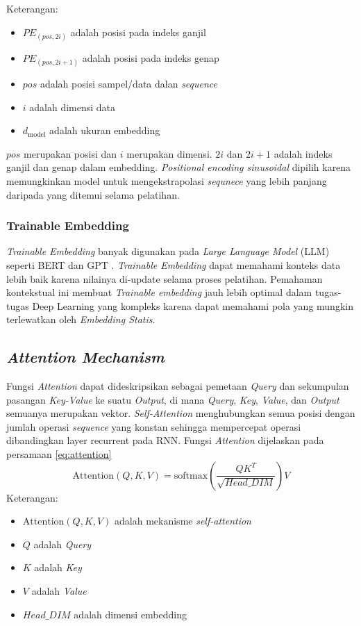 Keterangan:
\begin{itemize}
    \item $PE_{(pos, 2i)}$ adalah posisi pada indeks ganjil
    \item $PE_{(pos, 2i+1)}$ adalah posisi pada indeks genap
    \item $pos$ adalah posisi sampel/data dalan \textit{sequence}
    \item $i$ adalah dimensi data
    \item $d_{\text{model}}$ adalah ukuran embedding
\end{itemize}
$pos$ merupakan posisi dan $i$ merupakan dimensi. $2i$ dan $2i+1$ adalah indeks ganjil dan genap dalam embedding. \textit{Positional encoding sinusoidal} dipilih karena memungkinkan model untuk mengekstrapolasi \textit{sequnece} yang lebih panjang daripada yang ditemui selama pelatihan.

\subsubsection{Trainable Embedding}
\label{subsubsec:trainable_embedding}
\textit{Trainable Embedding} banyak digunakan pada \textit{Large Language Model} (LLM) seperti BERT \cite{devlin2019bertpretrainingdeepbidirectional} dan GPT \cite{radford2019language}. \textit{Trainable Embedding} dapat memahami konteks data lebih baik karena nilainya di-update selama proses pelatihan. Pemahaman kontekstual ini membuat \textit{Trainable embedding} jauh lebih optimal dalam tugas-tugas Deep Learning yang kompleks karena dapat memahami pola yang mungkin terlewatkan oleh \textit{Embedding Statis}.

\subsection{\textit{Attention Mechanism}}
Fungsi \textit{Attention} dapat dideskripsikan sebagai pemetaan \textit{Query} dan sekumpulan pasangan \textit{Key-Value} ke suatu \textit{Output}, di mana \textit{Query}, \textit{Key}, \textit{Value}, dan \textit{Output} semuanya merupakan vektor. \textit{Self-Attention} menghubungkan semua posisi dengan jumlah operasi \textit{sequence} yang konstan sehingga mempercepat operasi dibandingkan layer recurrent pada RNN. Fungsi \textit{Attention} dijelaskan pada persamaan \ref{eq:attention}
\begin{equation}
    \text{Attention}(Q, K, V) = \text{softmax}\left(\frac{QK^T}{\sqrt{Head\_DIM}}\right)V
    \label{eq:attention}
\end{equation}
Keterangan:
\begin{itemize}
    \item $\text{Attention}(Q, K, V)$ adalah mekanisme \textit{self-attention}
    \item $Q$ adalah \textit{Query}
    \item $K$ adalah \textit{Key}
    \item $V$ adalah \textit{Value}
    \item $Head\_DIM$ adalah dimensi embedding
\end{itemize}

